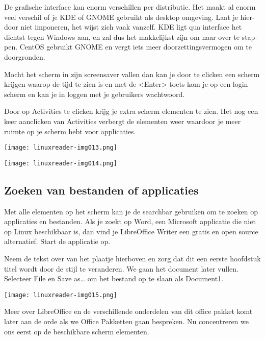 {
\foreignlanguage{dutch}{De grafische interface kan enorm verschillen per distributie. Het maakt al enorm veel verschil
of je KDE of GNOME gebruikt als desktop omgeving. Laat je hierdoor niet imponeren, het wijst zich vaak vanzelf. KDE
ligt qua interface het dichtst tegen Windows aan, en zal dus het makkelijkst zijn om naar over te stappen. CentOS
gebruikt GNOME en vergt iets meer doorzettingsvermogen om te doorgronden.}}

{
\foreignlanguage{dutch}{Mocht het scherm in zijn screensaver vallen dan kan je door te clicken een scherm krijgen waarop
de tijd te zien is en met de {\textless}Enter{\textgreater} toets kom je op een login scherm en kan je in loggen met je
gebruikers wachtwoord.}}

{
\foreignlanguage{dutch}{Door op Activities te clicken krijg je extra scherm elementen te zien. Het nog een keer
aanclicken van Activities verbergt de elementen weer waardoor je meer ruimte op je scherm hebt voor applicaties.}}



\begin{center}
\texttt{[image: linuxreader-img013.png]}
\end{center}
\begin{center}
\texttt{[image: linuxreader-img014.png]}
\end{center}

\bigskip

\subsection[Zoeken van bestanden of applicaties]{ Zoeken van bestanden of applicaties}
\hypertarget{RefHeadingToc74801786672253}{}{
Met alle elementen op het scherm kan je de searchbar gebruiken om te zoeken op applicaties en bestanden. Als je zoekt op
Word, een Microsoft applicatie die niet op Linux beschikbaar is, dan vind je LibreOffice Writer een gratis en open
source alternatief. Start de applicatie op.}

{
Neem de tekst over van het plaatje hierboven en zorg dat dit een eerste hoofdstuk titel wordt door de stijl te
veranderen. We gaan het document later vullen. Selecteer File en Save as{\dots} om het bestand op te slaan als
Document1.}

\begin{center}
\texttt{[image: linuxreader-img015.png]}
\end{center}
{
\foreignlanguage{dutch}{Meer over LibreOffice en de verschillende onderdelen van dit office pakket komt later aan de
orde als we Office Pakketten gaan bespreken. Nu concentreren we ons eerst op de beschikbare scherm elementen.}}


